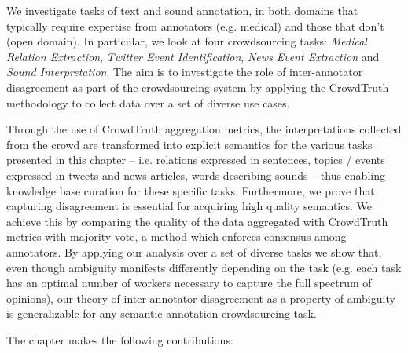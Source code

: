 We investigate tasks of text and sound annotation, in both domains that typically require expertise from annotators (e.g. medical) and those that don't (open domain).  In particular, we look at four crowdsourcing tasks: \textit{Medical Relation Extraction}, \textit{Twitter Event Identification}, \textit{News Event Extraction} and \textit{Sound Interpretation}.  The aim is to investigate the role of inter-annotator disagreement as part of the crowdsourcing system by applying the CrowdTruth methodology to collect data over a set of diverse use cases. 

Through the use of CrowdTruth aggregation metrics, the interpretations collected from the crowd are transformed into explicit semantics for the various tasks presented in this chapter -- i.e. relations expressed in sentences, topics / events expressed in tweets and news articles, words describing sounds -- thus enabling knowledge base curation for these specific tasks.  Furthermore, we prove that capturing disagreement is essential for acquiring high quality semantics.  We achieve this by comparing the quality of the data aggregated with CrowdTruth metrics with majority vote, a method which enforces consensus among annotators.  By applying our analysis over a set of diverse tasks we show that, even though ambiguity manifests differently depending on the task (e.g. each task has an optimal number of workers necessary to capture the full spectrum of opinions), our theory of inter-annotator disagreement as a property of ambiguity is generalizable for any semantic annotation crowdsourcing task.

The chapter makes the following contributions:

